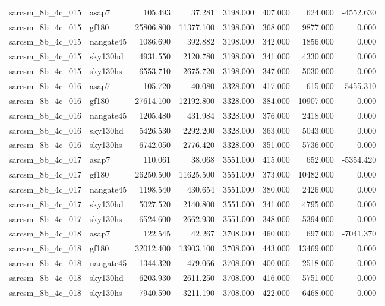\begin{tabular}{llrrrrrr}
sarcsm\_8b\_4c\_015 & asap7 & 105.493 & 37.281 & 3198.000 & 407.000 & 624.000 & -4552.630 \\
sarcsm\_8b\_4c\_015 & gf180 & 25806.800 & 11377.100 & 3198.000 & 368.000 & 9877.000 & 0.000 \\
sarcsm\_8b\_4c\_015 & nangate45 & 1086.690 & 392.882 & 3198.000 & 342.000 & 1856.000 & 0.000 \\
sarcsm\_8b\_4c\_015 & sky130hd & 4931.550 & 2120.780 & 3198.000 & 341.000 & 4330.000 & 0.000 \\
sarcsm\_8b\_4c\_015 & sky130hs & 6553.710 & 2675.720 & 3198.000 & 347.000 & 5030.000 & 0.000 \\
sarcsm\_8b\_4c\_016 & asap7 & 105.720 & 40.080 & 3328.000 & 417.000 & 615.000 & -5455.310 \\
sarcsm\_8b\_4c\_016 & gf180 & 27614.100 & 12192.800 & 3328.000 & 384.000 & 10907.000 & 0.000 \\
sarcsm\_8b\_4c\_016 & nangate45 & 1205.480 & 431.984 & 3328.000 & 376.000 & 2418.000 & 0.000 \\
sarcsm\_8b\_4c\_016 & sky130hd & 5426.530 & 2292.200 & 3328.000 & 363.000 & 5043.000 & 0.000 \\
sarcsm\_8b\_4c\_016 & sky130hs & 6742.050 & 2776.420 & 3328.000 & 351.000 & 5736.000 & 0.000 \\
sarcsm\_8b\_4c\_017 & asap7 & 110.061 & 38.068 & 3551.000 & 415.000 & 652.000 & -5354.420 \\
sarcsm\_8b\_4c\_017 & gf180 & 26250.500 & 11625.500 & 3551.000 & 373.000 & 10482.000 & 0.000 \\
sarcsm\_8b\_4c\_017 & nangate45 & 1198.540 & 430.654 & 3551.000 & 380.000 & 2426.000 & 0.000 \\
sarcsm\_8b\_4c\_017 & sky130hd & 5027.520 & 2140.800 & 3551.000 & 341.000 & 4795.000 & 0.000 \\
sarcsm\_8b\_4c\_017 & sky130hs & 6524.600 & 2662.930 & 3551.000 & 348.000 & 5394.000 & 0.000 \\
sarcsm\_8b\_4c\_018 & asap7 & 122.545 & 42.267 & 3708.000 & 460.000 & 697.000 & -7041.370 \\
sarcsm\_8b\_4c\_018 & gf180 & 32012.400 & 13903.100 & 3708.000 & 443.000 & 13469.000 & 0.000 \\
sarcsm\_8b\_4c\_018 & nangate45 & 1344.320 & 479.066 & 3708.000 & 400.000 & 2518.000 & 0.000 \\
sarcsm\_8b\_4c\_018 & sky130hd & 6203.930 & 2611.250 & 3708.000 & 416.000 & 5751.000 & 0.000 \\
sarcsm\_8b\_4c\_018 & sky130hs & 7940.590 & 3211.190 & 3708.000 & 422.000 & 6468.000 & 0.000 \\

\end{tabular}
